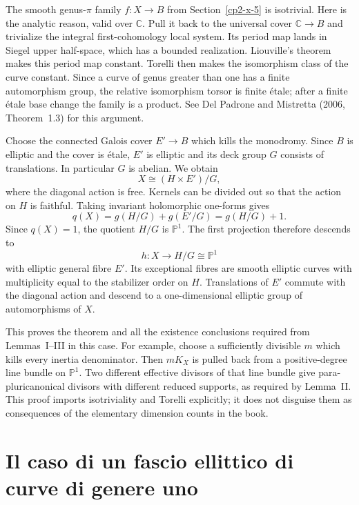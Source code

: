 The smooth genus-$\pi$ family $f:X\to B$ from Section~\ref{cp2-x-5} is isotrivial. Here is the analytic reason, valid over $\mathbb C$. Pull it back to the universal cover $\mathbb C\to B$ and trivialize the integral first-cohomology local system. Its period map lands in Siegel upper half-space, which has a bounded realization. Liouville's theorem makes this period map constant. Torelli then makes the isomorphism class of the curve constant. Since a curve of genus greater than one has a finite automorphism group, the relative isomorphism torsor is finite étale; after a finite étale base change the family is a product. See Del Padrone and Mistretta (2006, Theorem~1.3) for this argument.

Choose the connected Galois cover $E'\to B$ which kills the monodromy. Since $B$ is elliptic and the cover is étale, $E'$ is elliptic and its deck group $G$ consists of translations. In particular $G$ is abelian. We obtain
\begin{equation}
\label{cp2-x-translation-quotient}
 X\cong(H\times E')/G,
\end{equation}
where the diagonal action is free. Kernels can be divided out so that the action on $H$ is faithful. Taking invariant holomorphic one-forms gives
\[
 q(X)=g(H/G)+g(E'/G)=g(H/G)+1.
\]
Since $q(X)=1$, the quotient $H/G$ is $\mathbb P^1$. The first projection therefore descends to
\[
 h:X\longrightarrow H/G\cong\mathbb P^1
\]
with elliptic general fibre $E'$. Its exceptional fibres are smooth elliptic curves with multiplicity equal to the stabilizer order on $H$. Translations of $E'$ commute with the diagonal action and descend to a one-dimensional elliptic group of automorphisms of $X$.

This proves the theorem and all the existence conclusions required from Lemmas~I--III in this case. For example, choose a sufficiently divisible $m$ which kills every inertia denominator. Then $mK_X$ is pulled back from a positive-degree line bundle on $\mathbb P^1$. Two different effective divisors of that line bundle give para-pluricanonical divisors with different reduced supports, as required by Lemma~II. This proof imports isotriviality and Torelli explicitly; it does not disguise them as consequences of the elementary dimension counts in the book.

\section{Il caso di un fascio ellittico di curve di genere uno}
\label{cp2-x-11}

